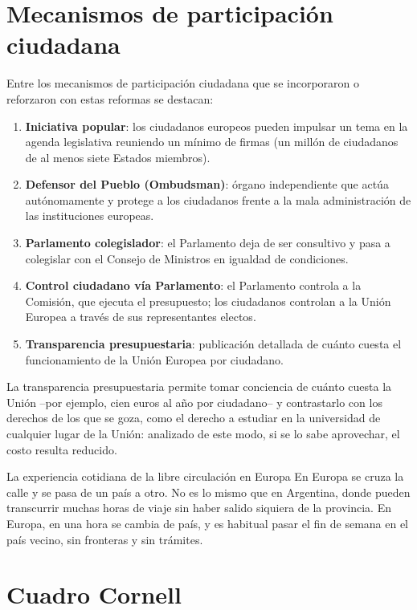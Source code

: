 \documentclass[12pt,oneside]{book}
\begin{document}
\section{Mecanismos de participación ciudadana}

Entre los mecanismos de participación ciudadana que se incorporaron o reforzaron con estas reformas se destacan:

\begin{enumerate}
    \item \textbf{Iniciativa popular}: los ciudadanos europeos pueden impulsar un tema en la agenda legislativa reuniendo un mínimo de firmas (un millón de ciudadanos de al menos siete Estados miembros).
    \item \textbf{Defensor del Pueblo (Ombudsman)}: órgano independiente que actúa autónomamente y protege a los ciudadanos frente a la mala administración de las instituciones europeas.
    \item \textbf{Parlamento colegislador}: el Parlamento deja de ser consultivo y pasa a colegislar con el Consejo de Ministros en igualdad de condiciones.
    \item \textbf{Control ciudadano vía Parlamento}: el Parlamento controla a la Comisión, que ejecuta el presupuesto; los ciudadanos controlan a la Unión Europea a través de sus representantes electos.
    \item \textbf{Transparencia presupuestaria}: publicación detallada de cuánto cuesta el funcionamiento de la Unión Europea por ciudadano.
\end{enumerate}

La transparencia presupuestaria permite tomar conciencia de cuánto cuesta la Unión --por ejemplo, cien euros al año por ciudadano-- y contrastarlo con los derechos de los que se goza, como el derecho a estudiar en la universidad de cualquier lugar de la Unión: analizado de este modo, si se lo sabe aprovechar, el costo resulta reducido.

\begin{ejemplo}{La experiencia cotidiana de la libre circulación en Europa}
En Europa se cruza la calle y se pasa de un país a otro. No es lo mismo que en Argentina, donde pueden transcurrir muchas horas de viaje sin haber salido siquiera de la provincia. En Europa, en una hora se cambia de país, y es habitual pasar el fin de semana en el país vecino, sin fronteras y sin trámites.
\end{ejemplo}

\section{Cuadro Cornell}
\end{document}
